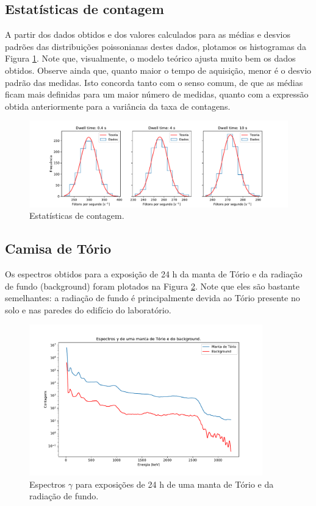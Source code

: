\documentclass[a4paper, 11pt, notitlepage]{article}
\numberwithin{equation}{section}  %
\begin{document}
\subsection{Estatísticas de contagem}

A partir dos dados obtidos e dos valores calculados para as médias e desvios padrões das distribuições poissonianas destes dados, plotamos os histogramas da Figura \ref{fig:estatisticas.contagem}. Note que, visualmente, o modelo teórico ajusta muito bem os dados obtidos. Observe ainda que, quanto maior o tempo de aquisição, menor é o desvio padrão das medidas. Isto concorda tanto com o senso comum, de que as médias ficam mais definidas para um maior número de medidas, quanto com a expressão obtida anteriormente para a variância da taxa de contagens.

\begin{figure}[h]
  \centering
  \includegraphics[width=1.0\textwidth]{estatisticas.pdf}
  \caption{Estatísticas de contagem.}
  \label{fig:estatisticas.contagem}
\end{figure}

\subsection{Camisa de Tório}

Os espectros obtidos para a exposição de 24 h da manta de Tório e  da radiação de fundo (background) foram plotados na Figura \ref{fig:espectro.manta.bkg}. Note que eles são bastante semelhantes: a radiação de fundo é principalmente devida ao Tório presente no solo e nas paredes do edifício do laboratório.

\begin{figure}[H]
  \centering
  \includegraphics[width=0.9\textwidth]{espectros_manta_bkg}
  \caption{Espectros $\gamma$ para exposições de 24 h de uma manta de Tório e da radiação de fundo.}
  \label{fig:espectro.manta.bkg}
\end{figure}
\end{document}
